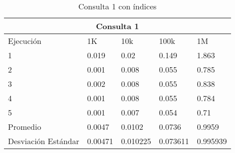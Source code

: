 \begin{table}%
\begin{center}%
\setlength{\tabcolsep}{0.3in}%
\begin{tabular}{|l|l|l|l|l|}%
\hline%
\multicolumn{5}{|c|}{Consulta 1}\\%
\hline%
Ejecución&1K&10k&100k&1M\\%
\hline%
1&0.019&0.02&0.149&1.863\\%
\hline%
2&0.001&0.008&0.055&0.785\\%
\hline%
3&0.002&0.008&0.055&0.838\\%
\hline%
4&0.001&0.008&0.055&0.784\\%
\hline%
5&0.001&0.007&0.054&0.71\\%
\hline%
Promedio&0.0047&0.0102&0.0736&0.9959\\%
\hline%
Desviación Estándar&0.00471&0.010225&0.073611&0.995939\\%
\hline%
\end{tabular}%
\end{center}%
\caption{Consulta 1 con índices}%
\end{table}